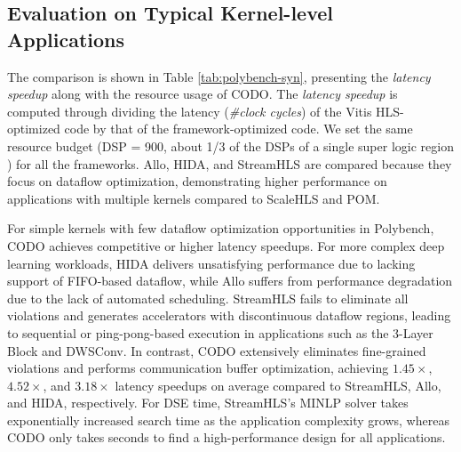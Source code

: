 \documentclass[conference]{IEEEtran}
\begin{document}



\subsection{Evaluation on Typical Kernel-level Applications}
The comparison is shown in Table \ref{tab:polybench-syn}, presenting the \textit{latency speedup} 
along with the resource usage of CODO. The \textit{latency speedup} is computed through dividing the latency (\textit{\#clock cycles}) of the Vitis HLS-optimized code by that of the framework-optimized code. We set the same resource budget (DSP = 900, about 1/3 of the DSPs of a single super logic region%
) for all the frameworks.
Allo, HIDA, and StreamHLS are compared 
because they focus on dataflow optimization, demonstrating higher performance on applications with multiple kernels compared to ScaleHLS and POM. 

For simple kernels with few dataflow optimization opportunities in Polybench, CODO achieves competitive or higher latency speedups.
For more complex deep learning workloads, HIDA delivers unsatisfying performance due to lacking support of FIFO-based dataflow, while Allo suffers from performance degradation due to the lack of automated scheduling. StreamHLS fails to eliminate all violations and generates accelerators with discontinuous dataflow regions, leading to sequential or ping-pong-based execution in applications such as the 3-Layer Block and DWSConv. In contrast, 
CODO extensively eliminates fine-grained violations and performs communication buffer optimization, achieving $1.45 \times$, $4.52\times$, and $3.18 \times$ latency speedups on average compared to StreamHLS, Allo, and HIDA, respectively. For DSE time, StreamHLS's MINLP solver takes 
exponentially increased search time as the application complexity grows,
whereas CODO only takes seconds to find a high-performance design for all applications.
\end{document}
